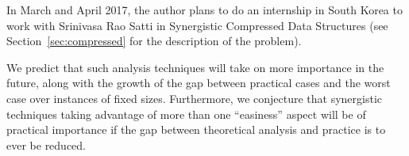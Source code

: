 
In March and April 2017, the author plans to do an internship in South
Korea to work with Srinivasa Rao Satti in Synergistic Compressed Data
Structures (see Section~\ref{sec:compressed} for the description of
the problem).

We predict that such analysis techniques will take on more importance
in the future, along with the growth of the gap between practical
cases and the worst case over instances of fixed sizes. Furthermore,
we conjecture that synergistic techniques taking advantage of more
than one ``easiness'' aspect will be of practical importance if the
gap between theoretical analysis and practice is to ever be reduced.

